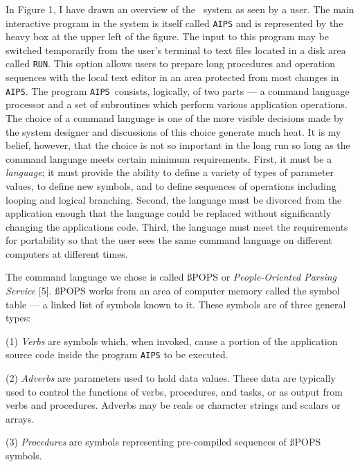 
     In Figure 1, I have drawn an overview of the \AIPS\ system as seen
by a user.  The main interactive program in the system is itself called
{\tt AIPS} and is represented by the heavy box at the upper left of the
figure.  The input to this program  may be switched temporarily from the
user's terminal to text files located in a disk area called \hbox{{\tt RUN}}.
This option allows users to prepare long procedures and operation
sequences with the local text editor in an area protected from most
changes in \hbox{{\tt AIPS}}.  The program {\tt AIPS}\ consists, logically, of
two parts --- a command language processor and a set of subroutines
which perform various application operations.  The choice of a command
language is one of the more visible decisions made by the system designer
and discussions of this choice generate much heat.  It is my belief,
however, that the choice is not so important in the long run so long
as the command language meets certain minimum requirements.  First, it
must be a {\it language}; it must provide the ability to define a
variety of types of parameter values, to define new symbols,
and to define sequences of operations including looping and logical
branching.   Second, the language must be divorced from the application
enough that the language could be replaced without significantly changing
the applications code.  Third, the language must meet the requirements
for portability so that the user sees the same command language on
different computers at different times.

     The command language we chose is called {\ss POPS} or {\it
People-Oriented Parsing Service} [5].  {\ss POPS} works from an area of
computer memory called the symbol table --- a linked list of symbols
known to it.  These symbols are of three general types:\pl\par

\item{(1)} {\it Verbs} are symbols which, when invoked, cause a
     portion of the application source code inside the program
     {\tt AIPS} to be executed.

\item{(2)} {\it Adverbs} are parameters used to hold data values.
     These data are typically used to control the functions of
     verbs, procedures, and tasks, or as output from verbs and
     procedures.  Adverbs may be reals or character strings and
     scalars or arrays.

\item{(3)} {\it Procedures} are symbols representing pre-compiled
     sequences of {\ss POPS} symbols.

